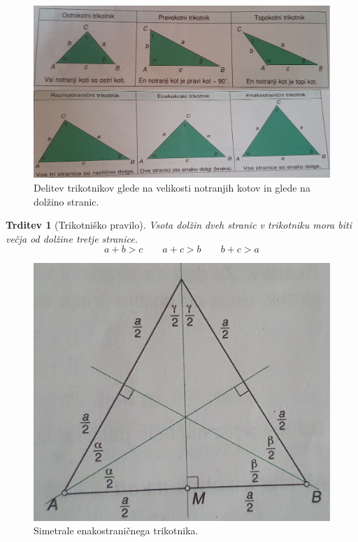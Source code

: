 \documentclass{article}
\newtheorem{trditev}{Trditev}[subsection]
\begin{document}
\begin{figure}[h]
    \includegraphics[width=0.7\linewidth]{delitevGledeNaKoteInStranice.png}
    \centering
    \caption{Delitev trikotnikov glede na velikosti notranjih kotov in glede na dolžino stranic.}
\end{figure}




\begin{trditev}[Trikotniško pravilo]
    Vsota dolžin dveh stranic v trikotniku mora biti večja od dolžine tretje stranice.
    \[
      a + b > c \quad\quad  a + c > b \quad\quad  b + c > a  
    \]
\end{trditev}


\begin{figure}[h]
    \includegraphics[width=0.5\linewidth]{simetraleEnakostranicni.png}
    \centering
    \caption{Simetrale enakostraničnega trikotnika.}
\end{figure}
\end{document}
